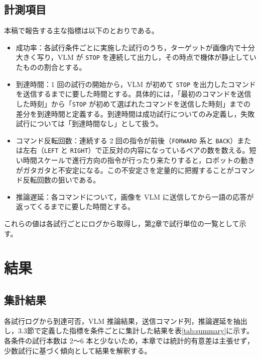 \documentclass[a4paper,11pt]{ltjsreport}
\begin{document}
\section{計測項目}
本稿で報告する主な指標は以下のとおりである。
\begin{itemize}
  \item 成功率：各試行条件ごとに実施した試行のうち，ターゲットが画像内で十分大きく写り，VLM が \texttt{STOP} を連続して出力し，その時点で機体が静止していたものの割合とする。

  \item 到達時間：1 回の試行の開始から，VLM が初めて \texttt{STOP} を出力したコマンドを送信するまでに要した時間とする。具体的には，「最初のコマンドを送信した時刻」から「\texttt{STOP} が初めて選ばれたコマンドを送信した時刻」までの差分を到達時間と定義する。到達時間は成功試行についてのみ定義し，失敗試行については「到達時間なし」として扱う。

  \item コマンド反転回数：連続する 2 回の指令が前後（\texttt{FORWARD} 系と \texttt{BACK}）または左右（\texttt{LEFT} と \texttt{RIGHT}）で正反対の内容になっているペアの数を数える。短い時間スケールで進行方向の指令が行ったり来たりすると，ロボットの動きがガタガタと不安定になる。この不安定さを定量的に把握することがコマンド反転回数の狙いである。

  \item 推論遅延：各コマンドについて，画像を VLM に送信してから一語の応答が返ってくるまでに要した時間とする。
\end{itemize}
これらの値は各試行ごとにログから取得し，第\ref{chap:results}章で試行単位の一覧として示す。

\chapter{結果}
\label{chap:results}
\section{集計結果}
各試行ログから到達可否，VLM 推論結果，送信コマンド列，推論遅延を抽出し，3.3節で定義した指標を条件ごとに集計した結果を表\ref{tab:summary}に示す。各条件の試行本数は 2〜6 本と少ないため，本章では統計的有意差は主張せず，少数試行に基づく傾向として結果を解釈する。
\end{document}
